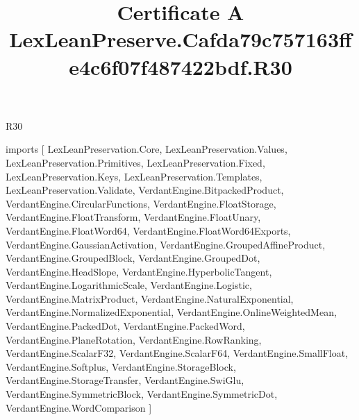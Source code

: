 \begin{lexlean}{R30}
\title{Certificate A LexLeanPreserve.Cafda79c757163ffe4c6f07f487422bdf.R30}
\begin{coremodule}
imports [
  LexLeanPreservation.Core,
  LexLeanPreservation.Values,
  LexLeanPreservation.Primitives,
  LexLeanPreservation.Fixed,
  LexLeanPreservation.Keys,
  LexLeanPreservation.Templates,
  LexLeanPreservation.Validate,
  VerdantEngine.BitpackedProduct,
  VerdantEngine.CircularFunctions,
  VerdantEngine.FloatStorage,
  VerdantEngine.FloatTransform,
  VerdantEngine.FloatUnary,
  VerdantEngine.FloatWord64,
  VerdantEngine.FloatWord64Exports,
  VerdantEngine.GaussianActivation,
  VerdantEngine.GroupedAffineProduct,
  VerdantEngine.GroupedBlock,
  VerdantEngine.GroupedDot,
  VerdantEngine.HeadSlope,
  VerdantEngine.HyperbolicTangent,
  VerdantEngine.LogarithmicScale,
  VerdantEngine.Logistic,
  VerdantEngine.MatrixProduct,
  VerdantEngine.NaturalExponential,
  VerdantEngine.NormalizedExponential,
  VerdantEngine.OnlineWeightedMean,
  VerdantEngine.PackedDot,
  VerdantEngine.PackedWord,
  VerdantEngine.PlaneRotation,
  VerdantEngine.RowRanking,
  VerdantEngine.ScalarF32,
  VerdantEngine.ScalarF64,
  VerdantEngine.SmallFloat,
  VerdantEngine.Softplus,
  VerdantEngine.StorageBlock,
  VerdantEngine.StorageTransfer,
  VerdantEngine.SwiGlu,
  VerdantEngine.SymmetricBlock,
  VerdantEngine.SymmetricDot,
  VerdantEngine.WordComparison
]


\end{coremodule}
\end{lexlean}
